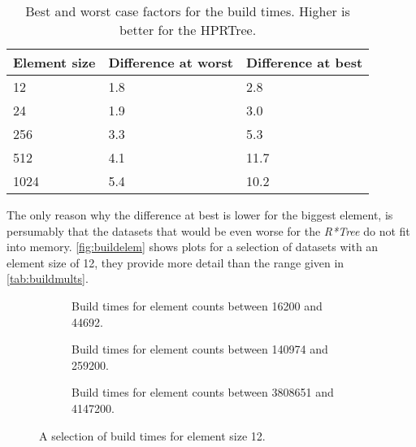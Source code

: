 \begin{table}[H]
    \centering
    \begin{tabular}{l|l|l}
        Element size & Difference at worst & Difference at best \\ \hline
        12           & 1.8                 & 2.8                \\ \hline
        24           & 1.9                 & 3.0                \\ \hline
        256          & 3.3                 & 5.3                \\ \hline
        512          & 4.1                 & 11.7               \\ \hline
        1024         & 5.4                 & 10.2
    \end{tabular}
    \caption[Best and worst case factors for the build times.]{Best and worst case factors for the build times. Higher is better for the \acs{HPRTree}.}
    \label{tab:buildmults}
\end{table}

The only reason why the difference at best is lower for the biggest element, is persumably that the datasets that would be even worse for the \textit{R*Tree} do not fit into memory. \autoref{fig:buildelem} shows plots for a selection of datasets with an element size of 12, they provide more detail than the range given in \autoref{tab:buildmults}.

\begin{figure}[H]
    \centering
    \begin{subfigure}{0.458\textwidth}
        
        \caption[Build times for element counts between 16200 and 44692.]{Build times for element counts between 16200 and 44692.}
        \label{sfig:buildelemsmall}
    \end{subfigure}\hfill
    \begin{subfigure}{0.458\textwidth}
        
        \caption[Build times for element counts between 140974 and 259200.]{Build times for element counts between 140974 and 259200.}
        \label{sfig:buildelemmedium}
    \end{subfigure}\hfill
    \begin{subfigure}{0.458\textwidth}
        
        \caption[Build times for element counts between 3808651 and 4147200.]{Build times for element counts between 3808651 and 4147200.}
        \label{sfig:buildelemlarge}
    \end{subfigure}
    \caption[A selection of build times for element size 12.]{A selection of build times for element size 12.}
    \label{fig:buildelem}
\end{figure}

